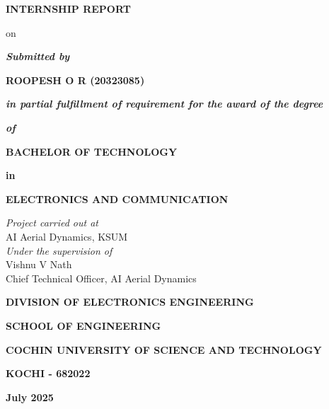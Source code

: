 \begin{titlepage}
	\titlepagefont
	\vspace*{.75cm}
	\centering
	{\sectionFont \textbf{INTERNSHIP REPORT} \par}
	\vspace{.2cm}
	{\sectionFont on \par}
	\vspace{.4cm}

	{ \par}

	\vspace{.7cm}

	\textit{\textbf{Submitted by}} \par
	\vspace{.5cm}

	\textbf {ROOPESH O R (20323085)} \par

	\vspace{.8cm}
	\textit{\textbf{in partial fulfillment of requirement for the award of the degree} }\par
	\textit{\textbf{of}} \par
	\vspace{.6cm}
	\textbf{BACHELOR OF TECHNOLOGY} \par
	\textbf{in} \par
	\textbf{ELECTRONICS AND COMMUNICATION} \par
	\vspace{.6cm}

	\par

	\vspace{.8cm}
	
	\textit {Project carried out at}\\
	AI Aerial Dynamics, KSUM\\[10pt]
	\textit {Under the supervision of} \\
	Vishnu V Nath \\ 
	Chief Technical Officer, AI Aerial Dynamics

	\vspace{1cm}

	\textbf{DIVISION OF ELECTRONICS ENGINEERING} \par
	\textbf{SCHOOL OF ENGINEERING} \par
	\textbf{COCHIN UNIVERSITY OF SCIENCE AND TECHNOLOGY} \par
	\textbf{KOCHI - 682022} \par

	\vspace{.5cm}

	\textbf{July 2025} \par

	\vspace*{\fill}

\end{titlepage}